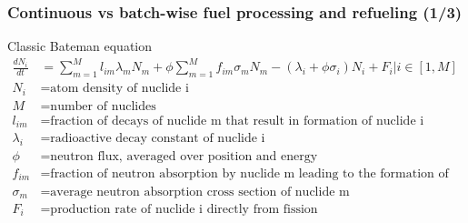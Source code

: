 \begin{frame}
\frametitle{Continuous vs batch-wise fuel processing  and refueling (1/3)}
\vspace{-7mm}
\begin{block}{Classic Bateman equation}
	\begin{align}
	\frac{dN_i}{dt} &= \sum_{m=1}^{M}l_{im}\lambda_mN_m + 
	\phi\sum_{m=1}^{M}f_{im}\sigma_mN_m - (\lambda_i + \phi\sigma_i)N_i + F_i\Big|{i\in [1,M]} \nonumber\\
	N_i &= \mbox{atom density of nuclide i} \nonumber \\
	M &= \mbox{number of nuclides} \nonumber \\
	l_{im} &= \mbox{fraction of decays of nuclide m that result in formation of 
		nuclide i}\nonumber \\
	\lambda_i &= \mbox{radioactive decay constant of nuclide i} \nonumber \\
	\phi &= \mbox{neutron flux, averaged over position and energy} \nonumber \\
	f_{im} &= \mbox{fraction of neutron absorption by nuclide m leading to the 
		formation of nuclide i} \nonumber \\
	\sigma_m &= \mbox{average neutron absorption cross section of nuclide m} 
	\nonumber \\
	F_i &= \mbox{production rate of nuclide i directly from fission}\nonumber
	\end{align}
\end{block}
\end{frame}


